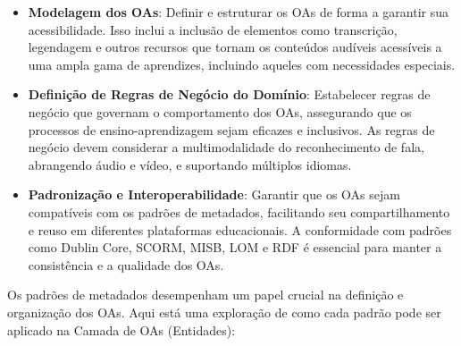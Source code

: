 \begin{itemize}
    \item \textbf{Modelagem dos OAs}: Definir e estruturar os OAs de forma a garantir sua acessibilidade. Isso inclui a inclusão de elementos como transcrição, legendagem e outros recursos que tornam os conteúdos audíveis acessíveis a uma ampla gama de aprendizes, incluindo aqueles com necessidades especiais.

    \item \textbf{Definição de Regras de Negócio do Domínio}: Estabelecer regras de negócio que governam o comportamento dos OAs, assegurando que os processos de ensino-aprendizagem sejam eficazes e inclusivos. As regras de negócio devem considerar a multimodalidade do reconhecimento de fala, abrangendo áudio e vídeo, e suportando múltiplos idiomas.

    \item \textbf{Padronização e Interoperabilidade}: Garantir que os OAs sejam compatíveis com os padrões de metadados, facilitando seu compartilhamento e reuso em diferentes plataformas educacionais. A conformidade com padrões como Dublin Core, SCORM, MISB, LOM e RDF é essencial para manter a consistência e a qualidade dos OAs.
\end{itemize}

Os padrões de metadados desempenham um papel crucial na definição e organização dos OAs. Aqui está uma exploração de como cada padrão pode ser aplicado na Camada de OAs (Entidades):

